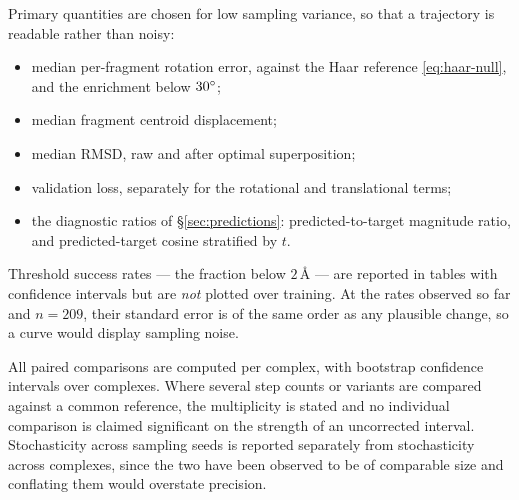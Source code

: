 Primary quantities are chosen for low sampling variance, so that a trajectory
is readable rather than noisy:

\begin{itemize}[leftmargin=*,itemsep=1pt]
\item median per-fragment rotation error, against the Haar reference
      \eqref{eq:haar-null}, and the enrichment below $30^{\circ}$;
\item median fragment centroid displacement;
\item median RMSD, raw and after optimal superposition;
\item validation loss, separately for the rotational and translational terms;
\item the diagnostic ratios of \S\ref{sec:predictions}: predicted-to-target
      magnitude ratio, and predicted-target cosine stratified by $t$.
\end{itemize}

Threshold success rates --- the fraction below $2$\,\AA{} --- are reported in
tables with confidence intervals but are \emph{not} plotted over training. At
the rates observed so far and $n = 209$, their standard error is of the same
order as any plausible change, so a curve would display sampling noise.

All paired comparisons are computed per complex, with bootstrap confidence
intervals over complexes. Where several step counts or variants are compared
against a common reference, the multiplicity is stated and no individual
comparison is claimed significant on the strength of an uncorrected interval.
Stochasticity across sampling seeds is reported separately from stochasticity
across complexes, since the two have been observed to be of comparable size
and conflating them would overstate precision.
